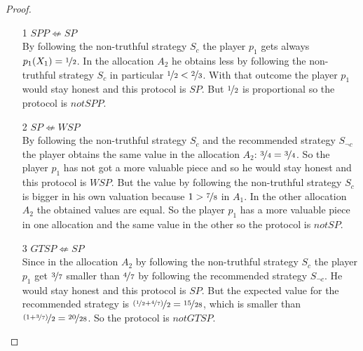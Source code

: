 \begin{proof}
\begin{enumerate}
\item[1] $SPP \not\Leftarrow SP$\\
By following the non-truthful strategy $S_c$ the player $p_1$ gets always $p_1(X_1)=\nicefrac{1}{2}$. In the allocation $A_2$ he obtains less by following the non-truthful strategy $S_c$ in particular $\nicefrac{1}{2} < \nicefrac{2}{3}$. With that outcome the player $p_1$ would stay honest and this protocol is $SP$. But $\nicefrac{1}{2}$ is proportional so the protocol is $notSPP$. 
\item[2] $SP \not\Leftarrow WSP$\\
By following the non-truthful strategy $S_c$ and the recommended strategy $S_{\neg c}$ the player obtains the same value in the allocation $A_2$: $\nicefrac{3}{4} = \nicefrac{3}{4}$. So the player $p_1$ has not got a more valuable piece and so he would stay honest and this protocol is $WSP$. But the value by following the non-truthful strategy $S_c$ is bigger in his own valuation because $1 > \nicefrac{7}{8}$ in $A_1$. In the other allocation $A_2$ the obtained values are equal. So the player $p_1$ has a more valuable piece in one allocation and the same value in the other so the protocol is $notSP$.
\item[3] $GTSP \not\Leftarrow SP$\\
Since in the allocation $A_2$ by following the non-truthful strategy $S_c$ the player $p_1$ get $\nicefrac{3}{7}$ smaller than $\nicefrac{4}{7}$ by following the recommended strategy $S_{\neg c}$. He would stay honest and this protocol is $SP$. But the expected value for the recommended strategy is $\nicefrac{(\nicefrac{1}{2}+\nicefrac{4}{7})}{2}=\nicefrac{15}{28}$, which is smaller than $\nicefrac{(1+\nicefrac{3}{7})}{2}=\nicefrac{20}{28}$. So the protocol is $notGTSP$. 
\end{enumerate}
\end{proof}

\pagebreak
